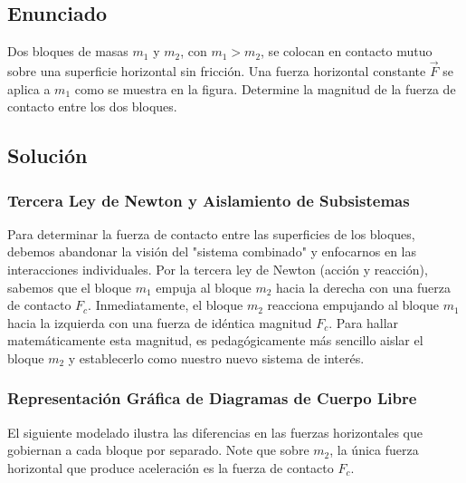 \documentclass[12pt]{article}
\begin{document}
\newpage

\subsection*{Enunciado}
Dos bloques de masas $m_1$ y $m_2$, con $m_1 > m_2$, se colocan en contacto mutuo sobre una superficie horizontal sin fricción. Una fuerza horizontal constante $\vec{F}$ se aplica a $m_1$ como se muestra en la figura. Determine la magnitud de la fuerza de contacto entre los dos bloques.

\begin{center}
\end{center}

\subsection*{Solución}

\subsubsection*{Tercera Ley de Newton y Aislamiento de Subsistemas}
Para determinar la fuerza de contacto entre las superficies de los bloques, debemos abandonar la visión del "sistema combinado" y enfocarnos en las interacciones individuales. Por la tercera ley de Newton (acción y reacción), sabemos que el bloque $m_1$ empuja al bloque $m_2$ hacia la derecha con una fuerza de contacto $F_c$. Inmediatamente, el bloque $m_2$ reacciona empujando al bloque $m_1$ hacia la izquierda con una fuerza de idéntica magnitud $F_c$. Para hallar matemáticamente esta magnitud, es pedagógicamente más sencillo aislar el bloque $m_2$ y establecerlo como nuestro nuevo sistema de interés.

\subsubsection*{Representación Gráfica de Diagramas de Cuerpo Libre}
El siguiente modelado ilustra las diferencias en las fuerzas horizontales que gobiernan a cada bloque por separado. Note que sobre $m_2$, la única fuerza horizontal que produce aceleración es la fuerza de contacto $F_c$.
\end{document}

